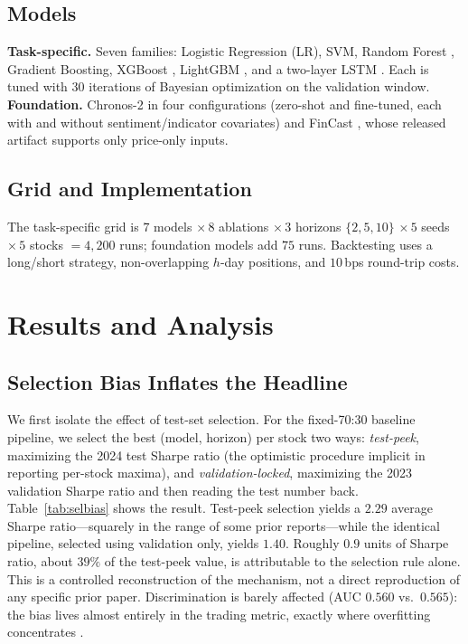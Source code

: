 \documentclass[conference]{IEEEtran}
\begin{document}
\subsection{Models}
\textbf{Task-specific.} Seven families: Logistic Regression (LR), SVM, Random
Forest \cite{breiman2001}, Gradient Boosting, XGBoost \cite{chen2016xgboost},
LightGBM \cite{ke2017lightgbm}, and a two-layer LSTM \cite{hochreiter1997}.
Each is tuned with $30$ iterations of Bayesian optimization \cite{skopt2021} on
the validation window. \textbf{Foundation.} Chronos-2 \cite{ansari2025chronos}
in four configurations (zero-shot and fine-tuned, each with and without
sentiment/indicator covariates) and FinCast \cite{zhu2025fincast}, whose
released artifact supports only price-only inputs.

\subsection{Grid and Implementation}
The task-specific grid is $7$ models $\times\,8$ ablations $\times\,3$ horizons
$\{2,5,10\}$ $\times\,5$ seeds $\times\,5$ stocks $=4{,}200$ runs; foundation
models add $75$ runs. Backtesting
uses a long/short strategy, non-overlapping $h$-day positions, and $10$\,bps
round-trip costs.

\section{Results and Analysis}
\label{sec:results}

\subsection{Selection Bias Inflates the Headline}
We first isolate the effect of test-set selection. For the
fixed-70:30 baseline pipeline, we select the best (model, horizon) per stock two ways:
\emph{test-peek}, maximizing the 2024 test Sharpe ratio (the optimistic procedure
implicit in reporting per-stock maxima), and \emph{validation-locked}, maximizing the
2023 validation Sharpe ratio and then reading the test number back.
Table~\ref{tab:selbias} shows the result. Test-peek selection yields a
$2.29$ average Sharpe ratio---squarely in the range of some prior reports---while
the identical pipeline, selected using validation only, yields $1.40$. Roughly $0.9$ units
of Sharpe ratio, about $39\%$ of the test-peek value, is attributable to the
selection rule alone. This is a controlled reconstruction of the mechanism,
not a direct reproduction of any specific prior paper.
Discrimination is barely affected (AUC $0.560$ vs.\ $0.565$): the bias lives
almost entirely in the trading metric, exactly where overfitting concentrates
\cite{bailey2014dsr}.
\end{document}
